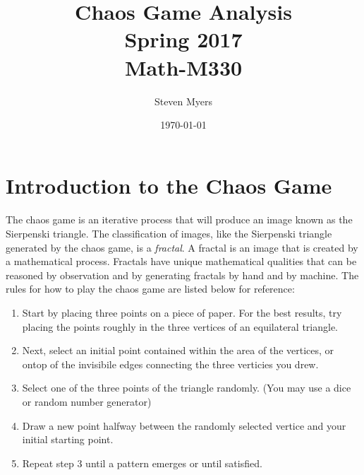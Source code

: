\documentclass{article}
\begin{document}
\title{Chaos Game Analysis\\ Spring 2017\\ Math-M330}         %
\author{Steven Myers}        %
\date{\today}          %
\maketitle


\makeatother     %

\pagestyle{plain}

\section*{Introduction to the Chaos Game}

\paragraph{}
The chaos game is an iterative process that will produce an image known as the Sierpenski triangle. The classification of images, like the Sierpenski triangle generated by the chaos game, is a \textit{fractal}. A fractal is an image that is created by a mathematical process. Fractals have unique mathematical qualities that can be reasoned by observation and by generating fractals by hand and by machine. The rules for how to play the chaos game are listed below for reference:
\begin{enumerate}
    \item
    Start by placing three points on a piece of paper. For the best results, try placing the points roughly in the three vertices of an equilateral triangle.
    \item
    Next, select an initial point contained within the area of the vertices, or ontop of the invisibile edges connecting the three verticies you drew.
    \item
    Select one of the three points of the triangle randomly. (You may use a dice or random number generator)
    \item
    Draw a new point halfway between the randomly selected vertice and your initial starting point.
    \item
    Repeat step 3 until a pattern emerges or until satisfied.
\end{enumerate}
\end{document}
